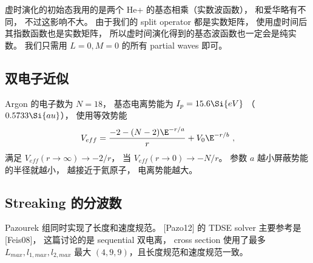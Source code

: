 虚时演化的初始态我用的是两个 He+ 的基态相乘（实数波函数）， 和爱华略有不同， 不过这影响不大。 由于我们的 split operator 都是实数矩阵， 使用虚时间后其指数函数也是实数矩阵， 所以虚时间演化得到的基态波函数也一定会是纯实数。
我们只需用 $L = 0, M = 0$ 的所有 partial waves 即可。

\subsection{双电子近似}
Argon 的电子数为 $N = 18$， 基态电离势能为 $I_p = 15.6\Si{eV}$ （$0.5733\Si{au}$）， 使用等效势能
\begin{equation}
V_{eff} = \frac{-2 - (N-2)\E^{-r/a}}{r} + V_0 \E^{-r/b}~,
\end{equation}
满足 $V_{eff}(r\to\infty) \to -2/r$， 当 $V_{eff}(r\to 0) \to -N/r$。 参数 $a$ 越小屏蔽势能的半径就越小， 越接近于氦原子， 电离势能越大。

\subsection{Streaking 的分波数}
Pazourek 组同时实现了长度和速度规范。 [Pazo12] 的 TDSE solver 主要参考是 [Feis08]， 这篇讨论的是 sequential 双电离， cross section 使用了最多 $L_{max},l_{1,max},l_{2,max}$ 最大 $(4,9,9)$，且长度规范和速度规范一致。

